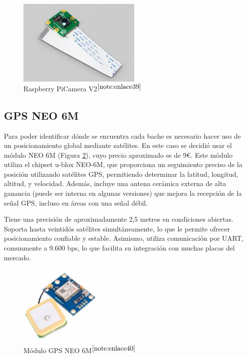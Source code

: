 \begin{figure} [h!]
	\begin{center}
		\includegraphics[width=6cm]{figs/campi.png}
	\end{center}
	\caption{Raspberry PiCamera V2$^{\ref{note:enlace39}}$} 
\label{fig:raspberrycam}
\end{figure}

\setcounter{footnote}{39} %

\subsection{GPS NEO 6M}
\label{subsec:gps}

Para poder identificar dónde se encuentra cada bache es necesario hacer uso de un posicionamiento global mediante satélites. En este caso se decidió usar el módulo NEO 6M (Figura \ref{fig:gps}), cuyo precio aproximado es de 9€. Este módulo utiliza el chipset u-blox NEO-6M, que proporciona un seguimiento preciso de la posición utilizando satélites \acs{GPS}, permitiendo determinar la latitud, longitud, altitud, y velocidad. Además, incluye una antena cerámica externa de alta ganancia (puede ser interna en algunas versiones) que mejora la recepción de la señal \acs{GPS}, incluso en áreas con una señal débil.

Tiene una precisión de aproximadamente 2,5 metros en condiciones abiertas. Soporta hasta veintidós satélites simultáneamente, lo que le permite ofrecer posicionamiento confiable y estable. Asimismo, utiliza comunicación por \ac{UART}, comunmente a 9.600 bps, lo que facilita su integración con muchas placas del mercado.

\begin{figure} [h!]
	\begin{center}
		\includegraphics[width=4cm]{figs/GPSNEO6MV2.jpeg}
	\end{center}
	\caption{Módulo GPS NEO 6M$^{\ref{note:enlace40}}$} 
\label{fig:gps}
\end{figure}

